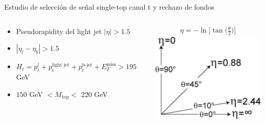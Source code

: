 \documentclass[10pt]{beamer}
\begin{document}
\begin{frame}{Estudio de selección de señal single-top canal t y rechazo de fondos}
\begin{columns}
\begin{column}{.65\textwidth}
		\color{olive}{The ATLAS collaboration, Aaboud, M., Aad, G. et al. J. High Energ. Phys. (2017) 2017: 124}
		\begin{itemize}
			\item Pseudorapidity del light jet $|\eta|>1.5$
			\item $|\eta_l-\eta_b|>1.5$
			\item $H_t=p_t^l+ p_t^{\text{light jet}}+p_t^{\text{b-jet}} + E_T^{\text{miss}} >195$ GeV
			\item $150$ GeV $<M_{\text{top}}<$ 220 GeV
		\end{itemize}
	\end{column}
	\begin{column}{.3\textwidth}
		$$\eta = -\ln\big[\tan\big(\tfrac{\theta}{2}\big)\big]
$$		\includegraphics[scale=0.33]{eta.png}
	\end{column}
\end{columns}
\end{frame}
\end{document}
